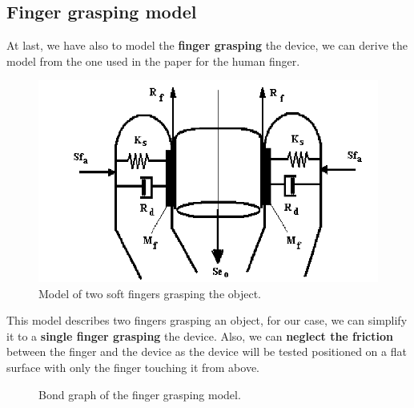 \subsection{Finger grasping model}
\begin{samepage}
    At last, we have also to model the \textbf{finger grasping} the device, we can derive the model from the one used in the paper \cite{Finger_grasping_model} for the human finger.
    \nopagebreak

    \begin{figure}[H]
        \centering
        \includegraphics[width = 0.4\linewidth]{Chapters/Chapter2/Modelling_of_Entire_System/Figures/Model-of-two-soft-fingers-grasping-the-object.png}
        \caption{Model of two soft fingers grasping the object.}
        \label{fig: Finger_grasping_model}
    \end{figure}
\end{samepage}

This model describes two fingers grasping an object, for our case, we can simplify it to a \textbf{single finger grasping} the device.
Also, we can \textbf{neglect the friction} between the finger and the device as the device will be tested positioned on a flat surface with only the finger touching it from above.
\begin{figure}[H]
    \centering
    \resizebox{.45\linewidth}{!}{
        
    }
    \caption{Bond graph of the finger grasping model.}
    \label{fig: Finger_grasping_bond_graph}
\end{figure}
